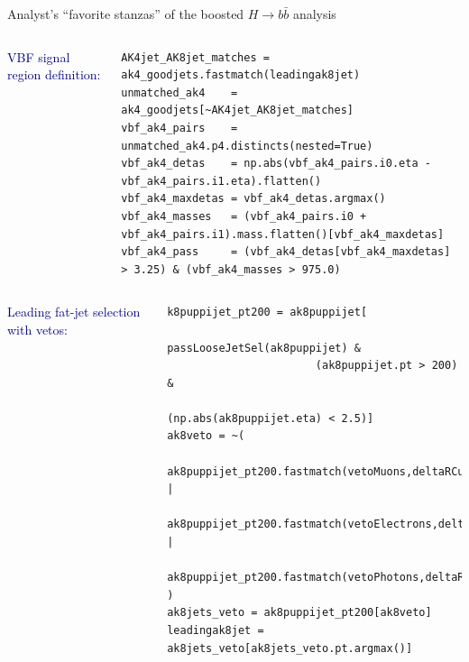 \documentclass[aspectratio=169]{beamer}
\begin{document}
\begin{frame}[fragile]{Analyst's ``favorite stanzas'' of the boosted $H \to b\bar{b}$ analysis}
\vspace{0.5 cm}





\begin{columns}
\textcolor{darkblue}{VBF signal region definition:}

\scriptsize
\begin{verbatim}
AK4jet_AK8jet_matches = ak4_goodjets.fastmatch(leadingak8jet)
unmatched_ak4    = ak4_goodjets[~AK4jet_AK8jet_matches]
vbf_ak4_pairs    = unmatched_ak4.p4.distincts(nested=True)
vbf_ak4_detas    = np.abs(vbf_ak4_pairs.i0.eta - vbf_ak4_pairs.i1.eta).flatten()
vbf_ak4_maxdetas = vbf_ak4_detas.argmax()
vbf_ak4_masses   = (vbf_ak4_pairs.i0 + vbf_ak4_pairs.i1).mass.flatten()[vbf_ak4_maxdetas]
vbf_ak4_pass     = (vbf_ak4_detas[vbf_ak4_maxdetas] > 3.25) & (vbf_ak4_masses > 975.0)
\end{verbatim}
\end{columns}

\normalsize

\vspace{0.5 cm}
\begin{columns}
\textcolor{darkblue}{Leading fat-jet selection with vetos:}
\scriptsize
\begin{verbatim}
k8puppijet_pt200 = ak8puppijet[
                       passLooseJetSel(ak8puppijet) & 
                       (ak8puppijet.pt > 200) & 
                       (np.abs(ak8puppijet.eta) < 2.5)]
ak8veto = ~(
    ak8puppijet_pt200.fastmatch(vetoMuons,deltaRCut=0.4) | 
    ak8puppijet_pt200.fastmatch(vetoElectrons,deltaRCut=0.4) |
    ak8puppijet_pt200.fastmatch(vetoPhotons,deltaRCut=0.4) )    
ak8jets_veto = ak8puppijet_pt200[ak8veto]    
leadingak8jet = ak8jets_veto[ak8jets_veto.pt.argmax()]
\end{verbatim}
\end{columns}
\end{frame}
\end{document}
